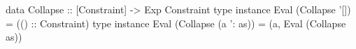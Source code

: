 \begin{code}
data Collapse :: [Constraint] -> Exp Constraint
type instance Eval (Collapse '[]) =
  (() :: Constraint)
type instance Eval (Collapse (a ': as)) =
  (a, Eval (Collapse as))
\end{code}
